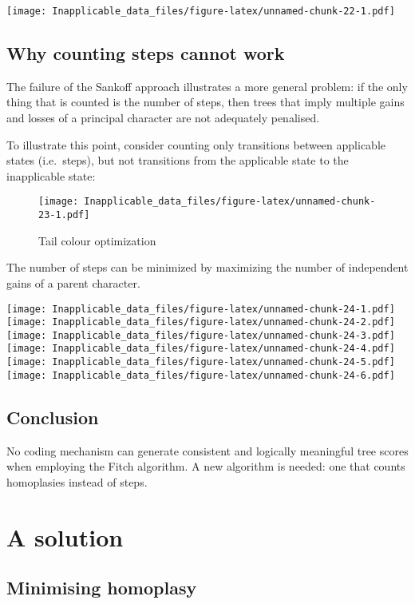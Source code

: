 \documentclass[]{book}
\theoremstyle{definition}
\theoremstyle{definition}
\theoremstyle{definition}
\theoremstyle{remark}
\begin{document}
\texttt{[image: Inapplicable\_data\_files/figure-latex/unnamed-chunk-22-1.pdf]}

\section{Why counting steps cannot
work}\label{why-counting-steps-cannot-work}

The failure of the Sankoff approach illustrates a more general problem:
if the only thing that is counted is the number of steps, then trees
that imply multiple gains and losses of a principal character are not
adequately penalised.

To illustrate this point, consider counting only transitions between
applicable states (i.e.~steps), but not transitions from the applicable
state to the inapplicable state:

\begin{figure}
\centering
\texttt{[image: Inapplicable\_data\_files/figure-latex/unnamed-chunk-23-1.pdf]}
\caption{\label{fig:unnamed-chunk-23}Tail colour optimization}
\end{figure}

The number of steps can be minimized by maximizing the number of
independent gains of a parent character.

\texttt{[image: Inapplicable\_data\_files/figure-latex/unnamed-chunk-24-1.pdf]}
\texttt{[image: Inapplicable\_data\_files/figure-latex/unnamed-chunk-24-2.pdf]}
\texttt{[image: Inapplicable\_data\_files/figure-latex/unnamed-chunk-24-3.pdf]}
\texttt{[image: Inapplicable\_data\_files/figure-latex/unnamed-chunk-24-4.pdf]}
\texttt{[image: Inapplicable\_data\_files/figure-latex/unnamed-chunk-24-5.pdf]}
\texttt{[image: Inapplicable\_data\_files/figure-latex/unnamed-chunk-24-6.pdf]}

\section{Conclusion}\label{conclusion}

No coding mechanism can generate consistent and logically meaningful
tree scores when employing the Fitch algorithm. A new algorithm is
needed: one that counts homoplasies instead of steps.

\hypertarget{solution}{\chapter{A solution}\label{solution}}

\section{Minimising homoplasy}\label{minimising-homoplasy}
\end{document}
